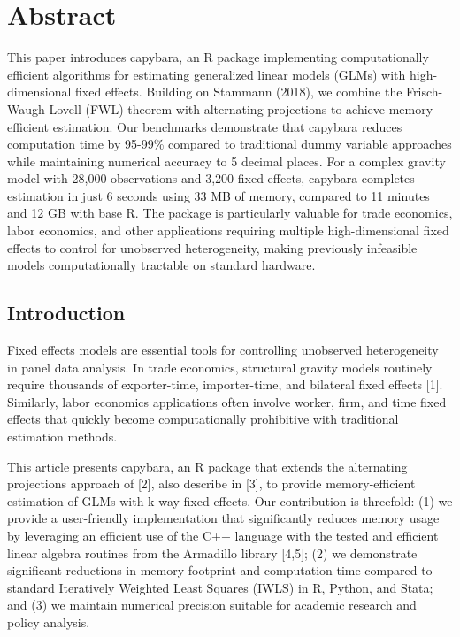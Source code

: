 \documentclass[
  10pt,
  letterpaper,
]{article}
\begin{document}
\section*{Abstract}
This paper introduces capybara, an R package implementing
computationally efficient algorithms for estimating generalized linear
models (GLMs) with high-dimensional fixed effects. Building on Stammann
(2018), we combine the Frisch-Waugh-Lovell (FWL) theorem with
alternating projections to achieve memory-efficient estimation. Our
benchmarks demonstrate that capybara reduces computation time by 95-99\%
compared to traditional dummy variable approaches while maintaining
numerical accuracy to 5 decimal places. For a complex gravity model with
28,000 observations and 3,200 fixed effects, capybara completes
estimation in just 6 seconds using 33 MB of memory, compared to 11
minutes and 12 GB with base R. The package is particularly valuable for
trade economics, labor economics, and other applications requiring
multiple high-dimensional fixed effects to control for unobserved
heterogeneity, making previously infeasible models computationally
tractable on standard hardware.


\linenumbers

\subsection{Introduction}\label{introduction}

Fixed effects models are essential tools for controlling unobserved
heterogeneity in panel data analysis. In trade economics, structural
gravity models routinely require thousands of exporter-time,
importer-time, and bilateral fixed effects {[}1{]}. Similarly, labor
economics applications often involve worker, firm, and time fixed
effects that quickly become computationally prohibitive with traditional
estimation methods.

This article presents capybara, an R package that extends the
alternating projections approach of {[}2{]}, also describe in {[}3{]},
to provide memory-efficient estimation of GLMs with k-way fixed effects.
Our contribution is threefold: (1) we provide a user-friendly
implementation that significantly reduces memory usage by leveraging an
efficient use of the C++ language with the tested and efficient linear
algebra routines from the Armadillo library {[}4,5{]}; (2) we
demonstrate significant reductions in memory footprint and computation
time compared to standard Iteratively Weighted Least Squares (IWLS) in
R, Python, and Stata; and (3) we maintain numerical precision suitable
for academic research and policy analysis.
\end{document}
